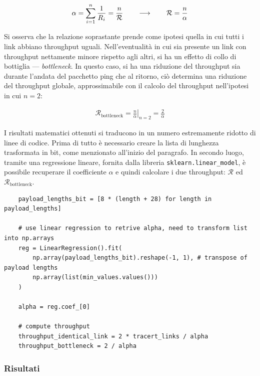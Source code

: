 \begin{gather*}
    \alpha = \sum_{i = 1}^n\frac{1}{R_i} = \frac{n}{\mathcal{R}} \hspace{20px} \longrightarrow \hspace{20px} \mathcal{R} = \frac{n}{\alpha}
\end{gather*}

\noindent Si osserva che la relazione soprastante prende come ipotesi quella in cui tutti i link abbiano throughput uguali. Nell'eventualità in cui sia presente un link con throughput nettamente minore rispetto agli altri, si ha un effetto di collo di bottiglia — \textsl{bottleneck}. In questo caso, si ha una riduzione del throughput sia durante l'andata del pacchetto ping che al ritorno, ciò determina una riduzione del throughput globale, approssimabile con il calcolo del throughput nell'ipotesi in cui $n = 2$:

\begin{gather*}
    \mathcal{R}_{\text{bottleneck}} = \left.\frac{n}{\alpha}\right|_{n = 2} = \frac{2}{\alpha} 
\end{gather*}

\vspace{20px}

\noindent I risultati matematici ottenuti si traducono in un numero estremamente ridotto di linee di codice. Prima di tutto è necessario creare la lista di lunghezza trasformata in bit, come menzionato all'inizio del paragrafo. In secondo luogo, tramite una regressione lineare, fornita dalla libreria \texttt{sklearn.linear\_model}, è possibile recuperare il coefficiente $\alpha$ e quindi calcolare i due throughput: $\mathcal{R}$ ed $\mathcal{R}_{\text{bottleneck}}$.

\begin{lstlisting}
    payload_lengths_bit = [8 * (length + 28) for length in payload_lengths]

    # use linear regression to retrive alpha, need to transform list into np.arrays
    reg = LinearRegression().fit(
        np.array(payload_lengths_bit).reshape(-1, 1), # transpose of payload lengths
        np.array(list(min_values.values())) 
    )

    alpha = reg.coef_[0]

    # compute throughput
    throughput_identical_link = 2 * tracert_links / alpha
    throughput_bottleneck = 2 / alpha
\end{lstlisting}

\vspace{10px}\subsubsection*{Risultati}

